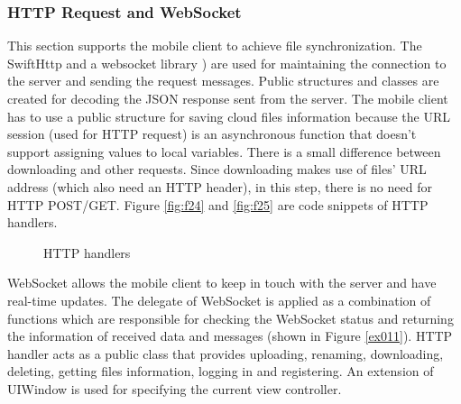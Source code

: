 \documentclass{article}
\begin{document}
\subsubsection{HTTP Request and WebSocket}

This section supports the mobile client to achieve file synchronization. The SwiftHttp \cite{c11} and a websocket library \cite{c12}) are used for maintaining the connection to the server and sending the request messages. Public structures and classes are created for decoding the JSON response sent from the server. The mobile client has to use a public structure for saving cloud files information because the URL session (used for HTTP request) is an asynchronous function that doesn't support assigning values to local variables. There is a small difference between downloading and other requests. Since downloading makes use of files' URL address (which also need an HTTP header), in this step, there is no need for HTTP POST/GET. Figure \ref{fig:f24} and \ref{fig:f25} are code snippets of HTTP handlers.

\begin{figure}[H]
  \centering
  \hfill
  \caption{HTTP handlers}
\end{figure}

WebSocket allows the mobile client to keep in touch with the server and have real-time updates. The delegate of WebSocket is applied as a combination of functions which are responsible for checking the WebSocket status and returning the information of received data and messages (shown in Figure \ref{ex011}). HTTP handler acts as a public class that provides uploading, renaming, downloading, deleting, getting files information, logging in and registering. An extension of UIWindow is used for specifying the current view controller. 
\end{document}
